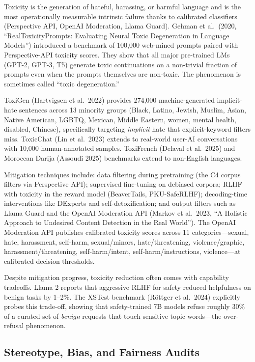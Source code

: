 \documentclass{article}
\begin{document}
Toxicity is the generation of hateful, harassing, or harmful language and is the most operationally measurable intrinsic failure thanks to calibrated classifiers (Perspective API, OpenAI Moderation, Llama Guard). Gehman et al.~(2020, ``RealToxicityPrompts: Evaluating Neural Toxic Degeneration in Language Models'') introduced a benchmark of 100,000 web-mined prompts paired with Perspective-API toxicity scores. They show that all major pre-trained LMs (GPT-2, GPT-3, T5) generate toxic continuations on a non-trivial fraction of prompts even when the prompts themselves are non-toxic. The phenomenon is sometimes called ``toxic degeneration.''

ToxiGen (Hartvigsen et al.~2022) provides 274,000 machine-generated implicit-hate sentences across 13 minority groups (Black, Latino, Jewish, Muslim, Asian, Native American, LGBTQ, Mexican, Middle Eastern, women, mental health, disabled, Chinese), specifically targeting \emph{implicit} hate that explicit-keyword filters miss. ToxicChat (Lin et al.~2023) extends to real-world user-AI conversations with 10,000 human-annotated samples. ToxiFrench (Delaval et al.~2025) and Moroccan Darija (Assoudi 2025) benchmarks extend to non-English languages.

Mitigation techniques include: data filtering during pretraining (the C4 corpus filters via Perspective API); supervised fine-tuning on debiased corpora; RLHF with toxicity in the reward model (BeaverTails, PKU-SafeRLHF); decoding-time interventions like DExperts and self-detoxification; and output filters such as Llama Guard and the OpenAI Moderation API (Markov et al.~2023, ``A Holistic Approach to Undesired Content Detection in the Real World''). The OpenAI Moderation API publishes calibrated toxicity scores across 11 categories---sexual, hate, harassment, self-harm, sexual/minors, hate/threatening, violence/graphic, harassment/threatening, self-harm/intent, self-harm/instructions, violence---at calibrated decision thresholds.

Despite mitigation progress, toxicity reduction often comes with capability tradeoffs. Llama 2 reports that aggressive RLHF for safety reduced helpfulness on benign tasks by 1--2\%. The XSTest benchmark (Röttger et al.~2024) explicitly probes this trade-off, showing that safety-trained 7B models refuse roughly 30\% of a curated set of \emph{benign} requests that touch sensitive topic words---the over-refusal phenomenon.

\subsection{Stereotype, Bias, and Fairness Audits}\label{stereotype-bias-and-fairness-audits}
\end{document}
